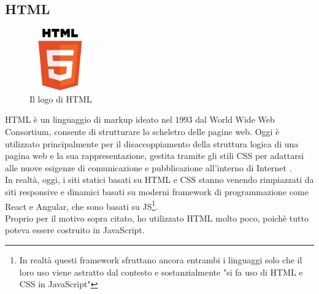 \subsection{HTML}
\begin{figure}[h]
    \centering
    \includegraphics[width=100px, height=100px]{./images/HTML.png}
    \caption{Il logo di HTML}
    \label{fig:HTML}
\end{figure}
HTML è un linguaggio di markup ideato nel 1993 dal World Wide Web Consortium, consente di strutturare lo scheletro delle pagine web. Oggi è utilizzato principalmente per il disaccoppiamento della struttura logica di una pagina web e la sua rappresentazione, gestita tramite gli stili CSS per adattarsi alle nuove esigenze di comunicazione e pubblicazione all'interno di Internet \cite{HTMLDef}.
\\
In realtà, oggi, i siti statici basati su HTML e CSS stanno venendo rimpiazzati da siti responsive e dinamici basati su moderni framework di programmazione come React e Angular, che sono basati su JS\footnote{
In realtà questi framework sfruttano ancora entrambi i linguaggi solo che il loro uso viene astratto dal contesto e sostanzialmente "si fa uso di HTML e CSS in JavaScript"
}.
\\
Proprio per il motivo sopra citato, ho utilizzato HTML molto poco, poichè tutto poteva essere costruito in JavaScript.

